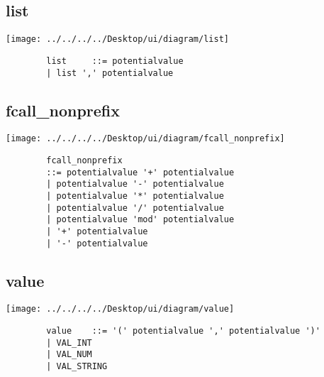 \documentclass[11pt]{scrartcl}
\begin{document}
\begin{flushleft}
			\subsection*{list}
		\texttt{[image: ../../../../Desktop/ui/diagram/list]}
		\begin{verbatim}
		list     ::= potentialvalue
		| list ',' potentialvalue
		\end{verbatim}
			\subsection*{fcall\_nonprefix}
		\texttt{[image: ../../../../Desktop/ui/diagram/fcall\_nonprefix]}
		\begin{verbatim}
		fcall_nonprefix
		::= potentialvalue '+' potentialvalue
		| potentialvalue '-' potentialvalue
		| potentialvalue '*' potentialvalue
		| potentialvalue '/' potentialvalue
		| potentialvalue 'mod' potentialvalue
		| '+' potentialvalue
		| '-' potentialvalue
		\end{verbatim}
			\subsection*{value}
		\texttt{[image: ../../../../Desktop/ui/diagram/value]}
		\begin{verbatim}
		value    ::= '(' potentialvalue ',' potentialvalue ')'
		| VAL_INT
		| VAL_NUM
		| VAL_STRING
		\end{verbatim}
\end{flushleft}

	
\end{document}
